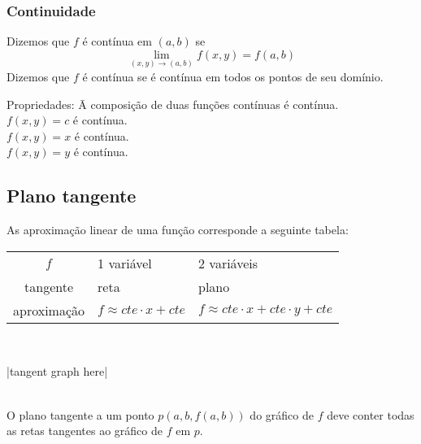 \documentclass{article}
\begin{document}
\subsubsection{Continuidade}
Dizemos que $f$ é contínua em $(a,b)$ se
\[ \lim_{(x,y) \to (a,b)} f(x,y) = f(a,b) \]
Dizemos que $f$ é contínua se é contínua em todos os pontos de seu domínio.
\begin{tabbing}
  Propriedades: \= A composição de duas funções contínuas é contínua.\\
  \> $f(x,y) = c$ é contínua.\\
  \> $f(x,y) = x$ é contínua.\\
  \> $f(x,y) = y$ é contínua.
\end{tabbing}

\pagebreak

\subsection{Plano tangente}
As aproximação linear de uma função corresponde a seguinte tabela:\\[5pt]
\begin{tabular}{cll}
  $f$ & 1 variável & 2 variáveis \\
  tangente & reta & plano \\
  aproximação & $f \approx cte \cdot x + cte$ & $f \approx cte \cdot x + cte \cdot y + cte$
\end{tabular}\\[10pt]
\centerline{|tangent graph here|}\\[5pt]
O plano tangente a um ponto $p(a, b, f(a,b))$ do gráfico de $f$ deve conter todas as retas tangentes ao gráfico de $f$ em $p$.
\end{document}
